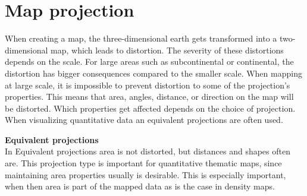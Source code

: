 \citep{LightIsLess} %





\section{Map projection}
When creating a map, the three-dimensional earth gets transformed into a two-dimensional map, which leads to distortion. The severity of these distortions depends on the scale. For large areas such as subcontinental or continental, the distortion has bigger consequences compared to the smaller scale. When mapping at large scale, it is impossible to prevent distortion to some of the projection’s properties. This means that area, angles, distance, or direction on the map will be distorted. Which properties get affected depends on the choice of projection. When visualizing quantitative data an equivalent projections are often used. 

\textbf{Equivalent projections}\\
In Equivalent projections area is not distorted, but distances and shapes often are. This projection type is important for quantitative thematic maps, since maintaining area properties usually is desirable. This is especially important, when then area is part of the mapped data as is the case in density maps.


%
%
%
%
















